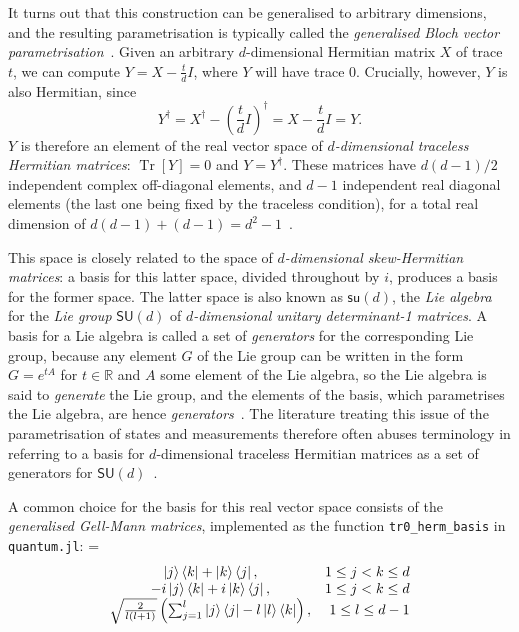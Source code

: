 \documentclass[10pt, a4paper]{article}
\numberwithin{equation}{section} %
\theoremstyle{definition}
\theoremstyle{plain}
\newenvironment{Array}[1] %
{\def\arraystretch{1.75}\everymath={\displaystyle}\begin{equation}\begin{array}{#1}}
{\end{array}\end{equation}}
\newcommand{\?}{\mathrel{?}} %
\newcommand{\R}{\mathbb{R}} %
\newcommand{\Tr}[2][]{\mathop{\mathrm{Tr}#1}\left[ #2 \right]} %
\begin{document}
\begin{appendices}
                          It turns out that this construction can be generalised to arbitrary dimensions, and the resulting parametrisation is typically called the \emph{generalised Bloch vector parametrisation}~\cite{DensMatParam}. Given an arbitrary \(d\)-dimensional Hermitian matrix \(X\) of trace \(t\), we can compute \(Y = X - \frac{t}{d}I\), where \(Y\) will have trace 0. Crucially, however, \(Y\) is also Hermitian, since
                          \[ Y^{\dagger} = X^{\dagger} - {\left(\frac{t}{d}I\right)}^{\dagger} = X - \frac{t}{d}I = Y. \]
                          \(Y\) is therefore an element of the real vector space of \emph{\(d\)-dimensional traceless Hermitian matrices}: \(\Tr{Y} = 0\) and \(Y = Y^{\dagger}\). These matrices have \(d(d-1)/2\) independent complex off-diagonal elements, and \(d-1\) independent real diagonal elements (the last one being fixed by the traceless condition), for a total real dimension of \(d(d-1)+(d-1) = d^2-1\)~\cite{CompositeParam}.

                          This space is closely related to the space of \emph{\(d\)-dimensional skew-Hermitian matrices}: a basis for this latter space, divided throughout by \(i\), produces a basis for the former space. The latter space is also known as \(\mathsf{su}(d)\), the \emph{Lie algebra} for the \emph{Lie group} \(\mathsf{SU}(d)\) of \emph{\(d\)-dimensional unitary determinant-1 matrices}. A basis for a Lie algebra is called a set of \emph{generators} for the corresponding Lie group, because any element \(G\) of the Lie group can be written in the form \(G = e^{tA}\) for \(t\in\R\) and \(A\) some element of the Lie algebra, so the Lie algebra is said to \emph{generate} the Lie group, and the elements of the basis, which parametrises the Lie algebra, are hence \emph{generators}~\cite{HallQuantumForMath}. The literature treating this issue of the parametrisation of states and measurements therefore often abuses terminology in referring to a basis for \(d\)-dimensional traceless Hermitian matrices as a set of generators for \(\mathsf{SU}(d)\)~\cite{QuditBloch,DensMatParam}.

                          A common choice for the basis for this real vector space consists of the \emph{generalised Gell-Mann matrices}, implemented as the function \verb`tr0_herm_basis` in \verb`quantum.jl`:
                          \begin{Array}{cr}
                            \ket{j}\bra{k}+\ket{k}\bra{j}, & 1 \leq j < k \leq d \\
                            -i\ket{j}\bra{k}+i\ket{k}\bra{j}, & 1 \leq j < k \leq d \\
                            \sqrt{\frac{2}{l(l+1)}} \left( \sum_{j=1}^l \ket{j}\bra{j} - l\ket{l}\bra{k} \right), & 1 \leq l \leq d-1 \\
                          \end{Array}


\end{appendices}
\end{document}
